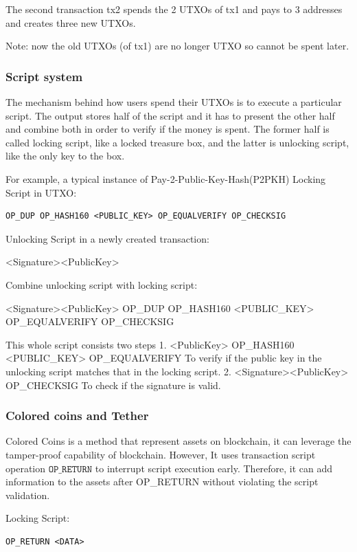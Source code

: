 \documentclass[a4paper,11pt]{article}
\begin{document}
The second transaction tx2 spends the 2 UTXOs of tx1 and pays to 3 addresses and creates three new UTXOs.

Note: now the old UTXOs (of tx1) are no longer UTXO so cannot be spent later.

\subsubsection*{Script system}

The mechanism behind how users spend their UTXOs is to execute a particular script. The output stores half of the script and it has to present the other half and combine both in order to verify if the money is spent. The former half is called locking script, like a locked treasure box, and the latter is unlocking script, like the only key to the box.

For example, a typical instance of  Pay-2-Public-Key-Hash(P2PKH)\cite{P2PKH} Locking Script in UTXO:

\begin{lstlisting}
OP_DUP OP_HASH160 <PUBLIC_KEY> OP_EQUALVERIFY OP_CHECKSIG
\end{lstlisting}

Unlocking Script in a newly created transaction:

<Signature><PublicKey>

Combine unlocking script with locking script:

<Signature><PublicKey> OP\_DUP OP\_HASH160 <PUBLIC\_KEY> OP\_EQUALVERIFY OP\_CHECKSIG

This whole script consists two steps
1. <PublicKey>  OP\_HASH160 <PUBLIC\_KEY> OP\_EQUALVERIFY
	To verify if the public key in the unlocking script matches that in the locking script.
2.  <Signature><PublicKey> OP\_CHECKSIG
	To check if the signature is valid.


\subsubsection*{Colored coins and Tether}

Colored Coins\cite{ColoredCoins} is a method that represent assets on blockchain, it can leverage the tamper-proof capability of blockchain. However, It uses transaction script operation $\texttt{OP\_RETURN}$ to interrupt script execution early. Therefore, it can add information to the assets after OP\_RETURN without violating the script validation. 

Locking Script:
\begin{lstlisting}
OP_RETURN <DATA>
\end{lstlisting}
\end{document}
